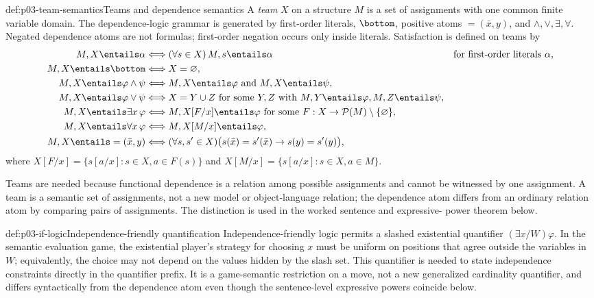 \begin{hbdefinition}{def:p03-team-semantics}{Teams and dependence semantics}
A \emph{team} \(X\) on a structure \(M\) is a set of assignments with one
common finite variable domain.  The dependence-logic grammar is generated by
first-order literals, \(\bottom\), positive atoms \(=(\bar x,y)\), and
\(\land,\lor,\exists,\forall\).  Negated dependence atoms are not formulas;
first-order negation occurs only inside literals.  Satisfaction is defined on
teams by
\[
\begin{aligned}
 M,X\entails\alpha
   &\Longleftrightarrow (\forall s\in X)\,M,s\entails\alpha
        &&\text{for first-order literals }\alpha,\\
 M,X\entails\bottom
   &\Longleftrightarrow X=\varnothing,\\
 M,X\entails\varphi\land\psi
   &\Longleftrightarrow M,X\entails\varphi\text{ and }M,X\entails\psi,\\
 M,X\entails\varphi\lor\psi
   &\Longleftrightarrow X=Y\cup Z\text{ for some }Y,Z
       \text{ with }M,Y\entails\varphi, M,Z\entails\psi,\\
 M,X\entails\exists x\,\varphi
   &\Longleftrightarrow M,X[F/x]\entails\varphi
       \text{ for some }F:X\to\mathcal P(M)\setminus\{\varnothing\},\\
 M,X\entails\forall x\,\varphi
   &\Longleftrightarrow M,X[M/x]\entails\varphi,\\
 M,X\entails=(\bar x,y)
   &\Longleftrightarrow
     (\forall s,s'\in X)\bigl(s(\bar x)=s'(\bar x)\to s(y)=s'(y)\bigr),
\end{aligned}
\]
where
\(X[F/x]=\{s[a/x]:s\in X, a\in F(s)\}\) and
\(X[M/x]=\{s[a/x]:s\in X, a\in M\}\).

Teams are needed because functional dependence is a relation among possible
assignments and cannot be witnessed by one assignment.  A team is a semantic
set of assignments, not a new model or object-language relation; the
dependence atom differs from an ordinary relation atom by comparing pairs of
assignments.  The distinction is used in the worked sentence and expressive-
power theorem below.
\end{hbdefinition}

\begin{hbdefinition}{def:p03-if-logic}{Independence-friendly quantification}
Independence-friendly logic permits a slashed existential quantifier
\((\exists x/W)\varphi\).  In the semantic evaluation game, the existential
player's strategy for choosing \(x\) must be uniform on positions that agree
outside the variables in \(W\); equivalently, the choice may not depend on the
values hidden by the slash set.  This quantifier is needed to state
independence constraints directly in the quantifier prefix.  It is a
game-semantic restriction on a move, not a new generalized cardinality
quantifier, and differs syntactically from the dependence atom even though the
sentence-level expressive powers coincide below.
\end{hbdefinition}

